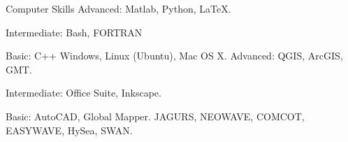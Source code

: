 
\begin{rubric}{Computer Skills}
\entry*[Languages]
	Advanced: Matlab, Python, \LaTeX. \par
	Intermediate: Bash, FORTRAN \par 
	Basic: C++ 
\entry*[Platforms OS]
	Windows, Linux (Ubuntu), Mac OS X.
\entry*[Tools]
	Advanced: QGIS, ArcGIS, GMT. \par
	Intermediate: Office Suite, Inkscape. \par 
	Basic: AutoCAD, Global Mapper.
	JAGURS, NEOWAVE, COMCOT, EASYWAVE, HySea, SWAN.
\end{rubric}
